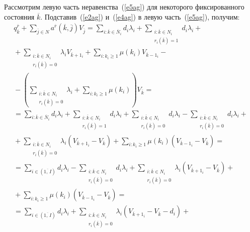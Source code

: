 \begin{multicols}{2}
  Рассмотрим левую часть неравенства~(\ref{e5ag}) для некоторого
фиксированного состояния $\overline{k}$. Подставив~(\ref{e2ag})
и~(\ref{e4ag}) в левую часть~(\ref{e5ag}), получим:
  \begin{multline}
  q_{\overline{k}}^{\overline{r}}+\sum\limits_{\overline{j}\in N}
a^{\overline{r}} (\overline{k},\overline{j}) V_{\overline{j}} =
  \sum\limits_{i:\overline{k}\in\overline{N}_i} d_i\lambda_i +
  \sum\limits_{\substack{{i:\overline{k}\in N_i}\\
  {r_i(\overline{k})=1}}}d_i\lambda_i +{}\\
  {}+
  \sum\limits_{\substack{{i:\overline{k}\in N_i}\\{r_i(\overline{k})=0}}}
\lambda_i V_{\overline{k}+1_i}+\sum\limits_{i:k_i\geq 1}
\mu(k_i)V_{\overline{k}-1_i} -{}\\
{}-\left (
  \sum\limits_{\substack{{i:\overline{k}\in N_i}\\{r_i(\overline{k})=0}}}
\lambda_i +\sum\limits_{i:k_i\geq 1}\mu(k_i)\right ) V_{\overline{k}}={}\\
  {}=
  \sum\limits_{i:\overline{k}\in\overline{N}_i} d_i\lambda_i+
  \sum\limits_{\substack{{i:\overline{k}\in N_i}\\{r_i(\overline{k})=1}}}
d_i\lambda_i +
  \sum\limits_{\substack{{i:\overline{k}\in N_i}\\{r_i(\overline{k})=0}}}
d_i\lambda_i -
  \sum\limits_{\substack{{i:\overline{k}\in N_i}\\{r_i(\overline{k})=0}}}
d_i\lambda_i +{}\\
{}+
\sum\limits_{\substack{{i:\overline{k}\in N_i}\\{r_i(\overline{k})=0}}}\lambda_i
(V_{\overline{k}+1_i}-V_{\overline{k}})+
  \sum\limits_{i:k_i\geq 1}\mu(k_i)(V_{\overline{k}-1_i} -V_{\overline{k}})={}\\
  {}=
  \sum\limits_{i\in(\overline{1,\,I})} d_i \lambda_i -
  \sum\limits_{\substack{{i:\overline{k}\in N_i}\\{r_i(\overline{k})=0}}}
  d_i\lambda_i +
  \sum\limits_{\substack{{i:\overline{k}\in N_i}\\{r_i(\overline{k})=0}}}\lambda_i
(V_{\overline{k}+1_i}-V_{\overline{k}})+{}\\
{}+\sum\limits_{i:k_i\geq 1}\mu(k_i)
  (V_{\overline{k}-1_i} -V_{\overline{k}})={}\\
  {}=
  \sum\limits_{i\in (\overline{1,\,I})}d_i\lambda_i+
  \sum\limits_{\substack{{i:\overline{k}\in N_i}\\{r_i(\overline{k})=0}}}
\lambda_i (V_{\overline{k}+1_i}-V_{\overline{k}} -d_i)+{}\\

\end{multline}
\end{multicols}
